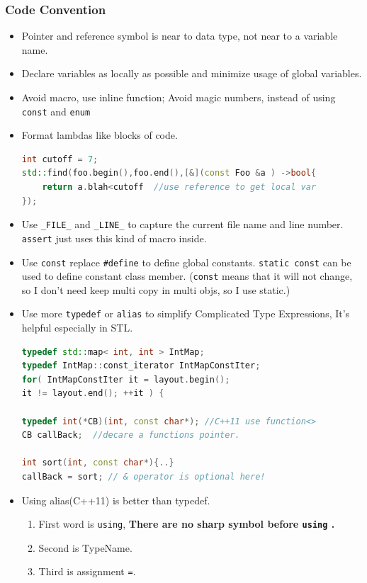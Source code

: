 \documentclass[a4paper,12pt,twoside]{book}
\begin{document}
\subsubsection{Code Convention}
\begin{itemize}
	
	\item Pointer and reference symbol is near to data type, not near to a variable name.
	

	\item Declare variables as locally as possible and minimize usage of global variables.
	
	\item Avoid macro, use inline function;  Avoid magic numbers, instead of using \texttt{const} and \texttt{enum}
	
	\item Format lambdas like blocks of code.
\begin{lstlisting}[frame=single, language=c++]
int cutoff = 7;
std::find(foo.begin(),foo.end(),[&](const Foo &a ) ->bool{
	return a.blah<cutoff  //use reference to get local var
});
\end{lstlisting}
	
	
	\item Use \texttt{\_FILE\_} and \texttt{\_LINE\_} to capture the current file name and line number.  \texttt{assert} just uses this kind of macro inside.
	
	\item Use \texttt{const} replace \texttt{\#define} to define global constants. \texttt{static const} can be used to define constant class member. (\texttt{const} means that it will not change, so I don't need keep multi copy in multi objs, so I use static.)
	
	\item Use more \texttt{typedef} or \texttt{alias} to simplify Complicated Type Expressions, It's helpful especially in STL. 
\begin{lstlisting}[frame=single, language=c++]
typedef std::map< int, int > IntMap;
typedef IntMap::const_iterator IntMapConstIter;
for( IntMapConstIter it = layout.begin();
it != layout.end(); ++it ) {

typedef int(*CB)(int, const char*); //C++11 use function<>
CB callBack;  //decare a functions pointer.
	
int sort(int, const char*){..}
callBack = sort; // & operator is optional here!
\end{lstlisting}
	
	\item Using alias(C++11) is better than typedef. 
	\begin{enumerate}
		\item First word is \texttt{using}, \textbf{There are no sharp symbol before \texttt{using} .} 
		\item Second is TypeName. 
		\item Third is assignment \texttt{=}.  
	\end{enumerate}
	

\end{itemize}
\end{document}
